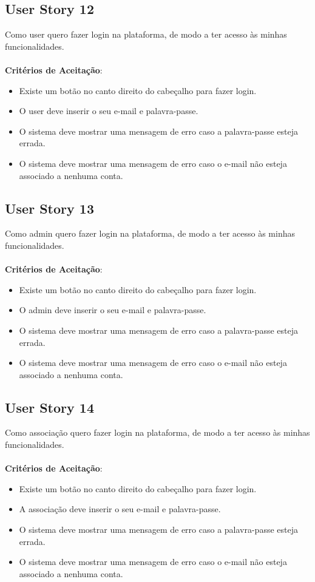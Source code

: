 \documentclass[a4paper,11pt]{article}
\begin{document}
\subsection{User Story 12}
Como user quero fazer login na plataforma, de modo a ter acesso às minhas funcionalidades.\\\\
\textbf{Critérios de Aceitação}:
\begin{itemize}
  \item Existe um botão no canto direito do cabeçalho para fazer login.
  \item O user deve inserir o seu e-mail e palavra-passe.
  \item O sistema deve mostrar uma mensagem de erro caso a palavra-passe esteja errada.
  \item O sistema deve mostrar uma mensagem de erro caso o e-mail não esteja associado a nenhuma conta.
\end{itemize}

\subsection{User Story 13}
Como admin quero fazer login na plataforma, de modo a ter acesso às minhas funcionalidades.\\\\
\textbf{Critérios de Aceitação}:
\begin{itemize}
  \item Existe um botão no canto direito do cabeçalho para fazer login.
  \item O admin deve inserir o seu e-mail e palavra-passe.
  \item O sistema deve mostrar uma mensagem de erro caso a palavra-passe esteja errada.
  \item O sistema deve mostrar uma mensagem de erro caso o e-mail não esteja associado a nenhuma conta.
\end{itemize}

\subsection{User Story 14}
Como associação quero fazer login na plataforma, de modo a ter acesso às minhas funcionalidades.\\\\
\textbf{Critérios de Aceitação}:
\begin{itemize}
  \item Existe um botão no canto direito do cabeçalho para fazer login.
  \item A associação deve inserir o seu e-mail e palavra-passe.
  \item O sistema deve mostrar uma mensagem de erro caso a palavra-passe esteja errada.
  \item O sistema deve mostrar uma mensagem de erro caso o e-mail não esteja associado a nenhuma conta.
\end{itemize}
\end{document}
